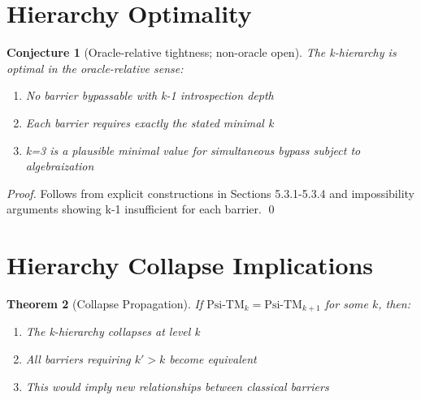 \documentclass[11pt]{article}
\newtheorem{theorem}{Theorem}[section]
\newtheorem{conjecture}[theorem]{Conjecture}
\theoremstyle{definition}
\begin{document}
\section{Hierarchy Optimality}
\begin{conjecture}[Oracle-relative tightness; non-oracle open]
The k-hierarchy is optimal in the oracle-relative sense:
\begin{enumerate}
\item No barrier bypassable with k-1 introspection depth
\item Each barrier requires exactly the stated minimal k
\item k=3 is a plausible minimal value for simultaneous bypass subject to algebraization
\end{enumerate}
\end{conjecture}
\begin{proof}
Follows from explicit constructions in Sections 5.3.1-5.3.4 and 
impossibility arguments showing k-1 insufficient for each barrier. \qed
\end{proof}

\section{Hierarchy Collapse Implications}

\begin{theorem}[Collapse Propagation]
If $\text{Psi-TM}_k = \text{Psi-TM}_{k+1}$ for some $k$, then:
\begin{enumerate}
\item The k-hierarchy collapses at level k
\item All barriers requiring $k' > k$ become equivalent
\item This would imply new relationships between classical barriers
\end{enumerate}
\end{theorem}
\end{document}
